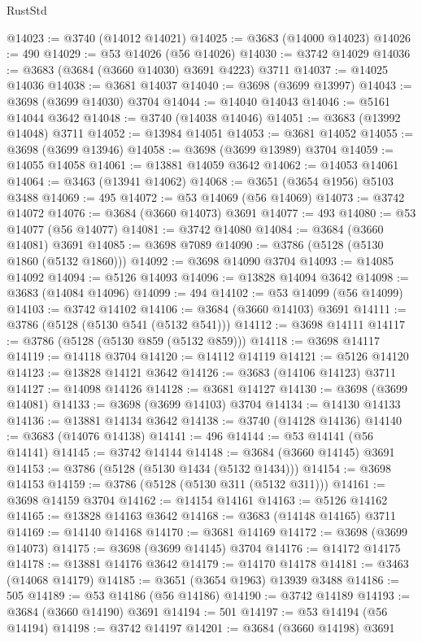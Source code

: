 \begin{lexlean}{RustStd}
\begin{coremodule}
{\begin{coremodule}
{{{{{{{{{{{{{{{{{{{{{{{{{{{{{{{{{{{{{{{{{{{{{{{@14023 := @3740 (@14012 @14021)
@14025 := @3683 (@14000 @14023)
@14026 := 490
@14029 := @53 @14026 (@56 @14026)
@14030 := @3742 @14029
@14036 := @3683 (@3684 (@3660 @14030) @3691 @4223) @3711
@14037 := @14025 @14036
@14038 := @3681 @14037
@14040 := @3698 (@3699 @13997)
@14043 := @3698 (@3699 @14030) @3704
@14044 := @14040 @14043
@14046 := @5161 @14044 @3642
@14048 := @3740 (@14038 @14046)
@14051 := @3683 (@13992 @14048) @3711
@14052 := @13984 @14051
@14053 := @3681 @14052
@14055 := @3698 (@3699 @13946)
@14058 := @3698 (@3699 @13989) @3704
@14059 := @14055 @14058
@14061 := @13881 @14059 @3642
@14062 := @14053 @14061
@14064 := @3463 (@13941 @14062)
@14068 := @3651 (@3654 @1956) @5103 @3488
@14069 := 495
@14072 := @53 @14069 (@56 @14069)
@14073 := @3742 @14072
@14076 := @3684 (@3660 @14073) @3691
@14077 := 493
@14080 := @53 @14077 (@56 @14077)
@14081 := @3742 @14080
@14084 := @3684 (@3660 @14081) @3691
@14085 := @3698 @7089
@14090 := @3786 (@5128 (@5130 @1860 (@5132 @1860)))
@14092 := @3698 @14090 @3704
@14093 := @14085 @14092
@14094 := @5126 @14093
@14096 := @13828 @14094 @3642
@14098 := @3683 (@14084 @14096)
@14099 := 494
@14102 := @53 @14099 (@56 @14099)
@14103 := @3742 @14102
@14106 := @3684 (@3660 @14103) @3691
@14111 := @3786 (@5128 (@5130 @541 (@5132 @541)))
@14112 := @3698 @14111
@14117 := @3786 (@5128 (@5130 @859 (@5132 @859)))
@14118 := @3698 @14117
@14119 := @14118 @3704
@14120 := @14112 @14119
@14121 := @5126 @14120
@14123 := @13828 @14121 @3642
@14126 := @3683 (@14106 @14123) @3711
@14127 := @14098 @14126
@14128 := @3681 @14127
@14130 := @3698 (@3699 @14081)
@14133 := @3698 (@3699 @14103) @3704
@14134 := @14130 @14133
@14136 := @13881 @14134 @3642
@14138 := @3740 (@14128 @14136)
@14140 := @3683 (@14076 @14138)
@14141 := 496
@14144 := @53 @14141 (@56 @14141)
@14145 := @3742 @14144
@14148 := @3684 (@3660 @14145) @3691
@14153 := @3786 (@5128 (@5130 @1434 (@5132 @1434)))
@14154 := @3698 @14153
@14159 := @3786 (@5128 (@5130 @311 (@5132 @311)))
@14161 := @3698 @14159 @3704
@14162 := @14154 @14161
@14163 := @5126 @14162
@14165 := @13828 @14163 @3642
@14168 := @3683 (@14148 @14165) @3711
@14169 := @14140 @14168
@14170 := @3681 @14169
@14172 := @3698 (@3699 @14073)
@14175 := @3698 (@3699 @14145) @3704
@14176 := @14172 @14175
@14178 := @13881 @14176 @3642
@14179 := @14170 @14178
@14181 := @3463 (@14068 @14179)
@14185 := @3651 (@3654 @1963) @13939 @3488
@14186 := 505
@14189 := @53 @14186 (@56 @14186)
@14190 := @3742 @14189
@14193 := @3684 (@3660 @14190) @3691
@14194 := 501
@14197 := @53 @14194 (@56 @14194)
@14198 := @3742 @14197
@14201 := @3684 (@3660 @14198) @3691
}}}}}}}}}}}}}}}}}}}}}}}}}}}}}}}}}}}}}}}}}}}}}}}
\end{coremodule}}
\end{coremodule}
\end{lexlean}
